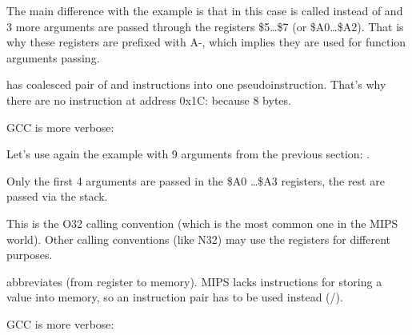 


The main difference with the \q{\HelloWorldSectionName} example is that in this case \printf is called
instead of \puts and 3 more arguments are passed through the registers \$5\dots \$7 (or \$A0\dots \$A2).
That is why these registers are prefixed with A-, which implies they are used for function arguments passing.





\IDA has coalesced pair of  and  instructions into one  pseudoinstruction.
That's why there are no instruction at address 0x1C: because   8 bytes.


\NonOptimizing GCC is more verbose:






Let's use again the example with 9 arguments from the previous section: .




Only the first 4 arguments are passed in the \$A0 \dots \$A3 registers, the rest are passed via the stack.

This is the O32 calling convention (which is the most common one in the MIPS world).
Other calling conventions (like N32) may use the registers for different purposes.


 abbreviates  (from register to memory).
MIPS lacks instructions for storing a value into memory, so an instruction pair has to be used instead (/).






\NonOptimizing GCC is more verbose:





